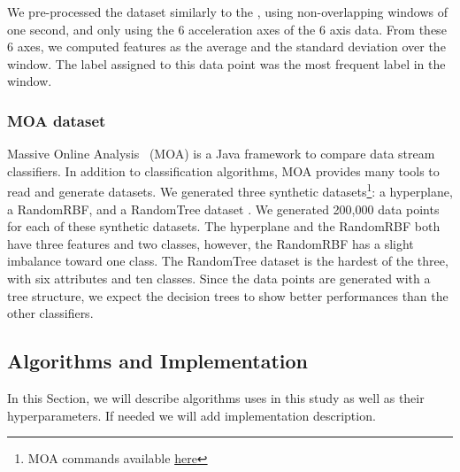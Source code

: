 We pre-processed the dataset similarly to the
\banosdataset, using non-overlapping windows of
one second, and only using the 6 acceleration axes
of the 6 axis data. From these 6 axes, we computed
features as the average and the standard deviation
over the window. The label assigned to this data
point was the most frequent label in the window.

\subsubsection{MOA dataset}
Massive Online Analysis~\cite{moa} (MOA) is a Java framework to compare
data stream classifiers. In addition to classification algorithms, MOA provides many
tools to read and generate datasets.
We generated three synthetic datasets\footnote{MOA commands available \href{https://github.com/azazel7/paper-benchmark/blob/e0c9a94d0d17490f7ab14293dec20b8322a6447c/Makefile\#L90}{here}}:
a hyperplane, a RandomRBF, and a RandomTree
dataset . We generated 200,000 data points
 for each of these synthetic datasets.
The hyperplane and the RandomRBF both have three features and two classes, however, the RandomRBF has a slight imbalance toward one class.
The RandomTree dataset is the hardest of the three, with six attributes and
ten classes. Since the data points are generated with a tree structure, we
expect the decision trees to show better performances than the other
classifiers.

\subsection{Algorithms and Implementation}


In this Section, we will describe algorithms uses
in this study as well as their hyperparameters. If
needed we will add implementation description.

